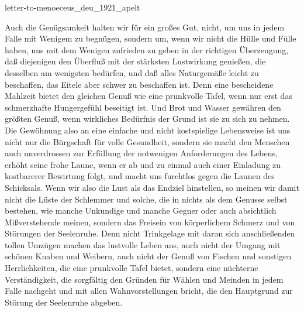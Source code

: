 \documentclass{stex}
\begin{document}
\begin{smodule}{letter-to-menoeceus_deu_1921_apelt}
\begin{sparagraph}[id=letter-to-menoeceus,name=Letter to Menoeceus]
  Auch die Genügsamkeit halten wir für ein großes Gut, nicht, um uns in jedem Falle mit Wenigem zu begnügen, sondern um, wenn wir nicht die Hülle und Fülle haben, uns mit dem Wenigen zufrieden zu geben in der richtigen Überzeugung, daß diejenigen den Überfluß mit der stärksten Lustwirkung genießen, die desselben am wenigsten bedürfen, und daß alles Naturgemäße leicht zu beschaffen, das Eitele aber schwer zu beschaffen ist.
  Denn eine bescheidene Mahlzeit bietet den gleichen Genuß wie eine prunkvolle Tafel, wenn nur erst das schmerzhafte Hungergefühl beseitigt ist.
  Und Brot und Wasser gewähren den größten Genuß, wenn wirkliches Bedürfnis der Grund ist sie zu sich zu nehmen.
  Die Gewöhnung also an eine einfache und nicht kostspielige Lebensweise ist uns nicht nur die Bürgschaft für volle Gesundheit, sondern sie macht den Menschen auch unverdrossen zur Erfüllung der notwenigen Anforderungen des Lebens, erhöht seine frohe Laune, wenn er ab und zu einmal auch einer Einladung zu kostbarerer Bewirtung folgt, und macht uns furchtlos gegen die Launen des Schicksals.
  Wenn wir also die Lust als das Endziel hinstellen, so meinen wir damit nicht die Lüste der Schlemmer und solche, die in nichts als dem Genusse selbst bestehen, wie manche Unkundige und manche Gegner oder auch absichtlich Mißverstehende meinen, sondern das Freisein von körperlichem Schmerz und von Störungen der Seelenruhe.
  Denn nicht Trinkgelage mit daran sich anschließenden tollen Umzügen machen das lustvolle Leben aus, auch nicht der Umgang mit schönen Knaben und Weibern, auch nicht der Genuß von Fischen und sonstigen Herrlichkeiten, die eine prunkvolle Tafel bietet, sondern eine nüchterne Verständigkeit, die sorgfältig den Gründen für Wählen und Meinden in jedem Falle nachgeht und mit allen Wahnvorstellungen bricht, die den Hauptgrund zur Störung der Seelenruhe abgeben.


\end{sparagraph}
\end{smodule}
\end{document}
